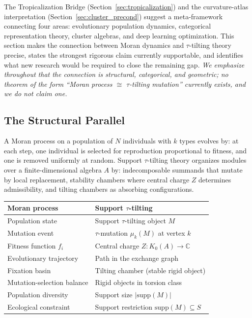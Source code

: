 \documentclass[11pt]{amsart}
\begin{document}
The Tropicalization Bridge (Section~\ref{sec:tropicalization}) and
the curvature-atlas interpretation (Section~\ref{sec:cluster_precond})
suggest a meta-framework connecting four areas: evolutionary population
dynamics, categorical representation theory, cluster algebras, and deep
learning optimization.
This section makes the connection between Moran dynamics and
$\tau$-tilting theory precise, states the strongest rigorous claim
currently supportable, and identifies what new research would be
required to close the remaining gap.
\emph{We emphasize throughout that the connection is structural,
categorical, and geometric; no theorem of the form
``Moran process $\cong$ $\tau$-tilting mutation'' currently exists,
and we do not claim one.}

\subsection{The Structural Parallel}
\label{sec:moran_parallel}

A Moran process on a population of $N$ individuals with $k$ types
evolves by: at each step, one individual is selected for reproduction
proportional to fitness, and one is removed uniformly at random.
Support $\tau$-tilting theory organizes modules over a
finite-dimensional algebra $A$ by:
indecomposable summands that mutate by local replacement,
stability chambers where central charge $Z$ determines admissibility,
and tilting chambers as absorbing configurations.

\begin{center}
\small
\begin{tabular}{@{}ll@{}}
\toprule
Moran process & Support $\tau$-tilting \\
\midrule
Population state & Support $\tau$-tilting object $M$ \\
Mutation event & $\tau$-mutation $\mu_k(M)$ at vertex $k$ \\
Fitness function $f_i$ & Central charge $Z: K_0(A) \to \mathbb{C}$ \\
Evolutionary trajectory & Path in the exchange graph \\
Fixation basin & Tilting chamber (stable rigid object) \\
Mutation-selection balance & Rigid objects in torsion class \\
Population diversity & Support size $|\mathrm{supp}(M)|$ \\
Ecological constraint & Support restriction $\mathrm{supp}(M) \subseteq S$ \\
\bottomrule
\end{tabular}
\end{center}
\end{document}
